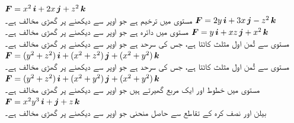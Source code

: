 \({{\boldsymbol{F}}}=x^2\,{\boldsymbol{i}}+2x\,{\boldsymbol{j}}+z^2\,{\boldsymbol{k}}\)\\
مستوی  میں    ترخیم   ہے   جو اوپر سے دیکھنے پر گھڑی مخالف ہے۔
\wf{\unexpanded{$4\pi$}}
\({{\boldsymbol{F}}}=2y\,{\boldsymbol{i}}+3x\,{\boldsymbol{j}}-z^2\,{\boldsymbol{k}}\)\\
مستوی  میں     دائرہ    ہے  جو اوپر سے دیکھنے پر گھڑی مخالف ہے۔
\({{\boldsymbol{F}}}=y\,{\boldsymbol{i}}+xz\,{\boldsymbol{j}}+x^2\,{\boldsymbol{k}}\)\\
 مستوی   سے ثُمن اول  مثلث کاٹتا ہے،  جس کی سرحد    ہے   جو اوپر سے دیکھنے پر گھڑی مخالف ہے۔
\({{\boldsymbol{F}}}=(y^2+z^2)\,{\boldsymbol{i}}+(x^2+z^2)\,{\boldsymbol{j}}+(x^2+y^2)\,{\boldsymbol{k}}\)\\
 مستوی   سے ثُمن اول  مثلث کاٹتا ہے،  جس کی سرحد    ہے   جو اوپر سے دیکھنے پر گھڑی مخالف ہے۔
\({{\boldsymbol{F}}}=(y^2+z^2)\,{\boldsymbol{i}}+(x^2+y^2)\,{\boldsymbol{j}}+(x^2+y^2)\,{\boldsymbol{k}}\)\\
مستوی  میں خطوط  اور     ایک مربع    گھیرتے  ہیں  جو اوپر سے دیکھنے پر گھڑی مخالف ہے۔
\({{\boldsymbol{F}}}=x^2y^3\,{\boldsymbol{i}}+{\boldsymbol{j}}+z\,{\boldsymbol{k}}\)\\
بیلن  اور نصف کرہ   کے تقاطع سے حاصل  منحنی   جو اوپر سے دیکھنے پر   گھڑی مخالف  ہے۔

